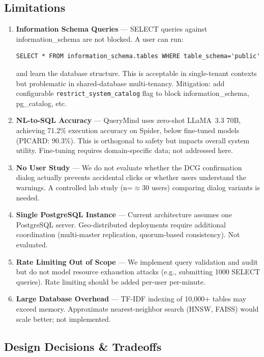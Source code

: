 \documentclass[conference]{IEEEtran}
\begin{document}
\subsection{Limitations}
\begin{enumerate}
  \item \textbf{Information Schema Queries} --- SELECT queries against information\_schema are not blocked. A user can run:
  \begin{lstlisting}
SELECT * FROM information_schema.tables WHERE table_schema='public'
  \end{lstlisting}
  and learn the database structure. This is acceptable in single-tenant contexts but problematic in shared-database multi-tenancy. Mitigation: add configurable \texttt{restrict\_system\_catalog} flag to block information\_schema, pg\_catalog, etc.
  
  \item \textbf{NL-to-SQL Accuracy} --- QueryMind uses zero-shot LLaMA~3.3 70B, achieving 71.2\% execution accuracy on Spider, below fine-tuned models (PICARD: 90.3\%). This is orthogonal to safety but impacts overall system utility. Fine-tuning requires domain-specific data; not addressed here.
  
  \item \textbf{No User Study} --- We do not evaluate whether the DCG confirmation dialog actually prevents accidental clicks or whether users understand the warnings. A controlled lab study (n=$\approx$30 users) comparing dialog variants is needed.
  
  \item \textbf{Single PostgreSQL Instance} --- Current architecture assumes one PostgreSQL server. Geo-distributed deployments require additional coordination (multi-master replication, quorum-based consistency). Not evaluated.
  
  \item \textbf{Rate Limiting Out of Scope} --- We implement query validation and audit but do not model resource exhaustion attacks (e.g., submitting 1000 SELECT \* queries). Rate limiting should be added per-user per-minute.
  
  \item \textbf{Large Database Overhead} --- TF-IDF indexing of 10,000+ tables may exceed memory. Approximate nearest-neighbor search (HNSW, FAISS) would scale better; not implemented.
\end{enumerate}

\subsection{Design Decisions \& Tradeoffs}
\end{document}

